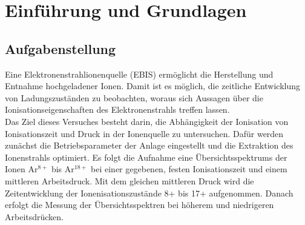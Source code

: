\section{Einführung und Grundlagen}
    
    \subsection{Aufgabenstellung}
    Eine Elektronenstrahlionenquelle (EBIS) ermöglicht die Herstellung und Entnahme hochgeladener Ionen. Damit ist es möglich, die zeitliche Entwicklung von Ladungszuständen zu beobachten, woraus sich Aussagen über die Ionisationseigenschaften des Elektronenstrahls treffen lassen. \\
    Das Ziel dieses Versuches besteht darin, die Abhängigkeit der Ionisation von Ionisationszeit und Druck in der Ionenquelle zu untersuchen. Dafür werden zunächst die Betriebsparameter der Anlage eingestellt und die Extraktion des Ionenstrahls optimiert.
    Es folgt die Aufnahme eine Übersichtsspektrums der Ionen Ar$^{8+}$ bis Ar$^{18+}$ bei einer gegebenen, festen Ionisationszeit und einem mittleren Arbeitsdruck.
    Mit dem gleichen mittleren Druck wird die Zeitentwicklung der Ionenisationszustände 8+ bis 17+ aufgenommen.
    Danach erfolgt die Messung der Übersichtsspektren bei höherem und niedrigeren Arbeitsdrücken.
    
